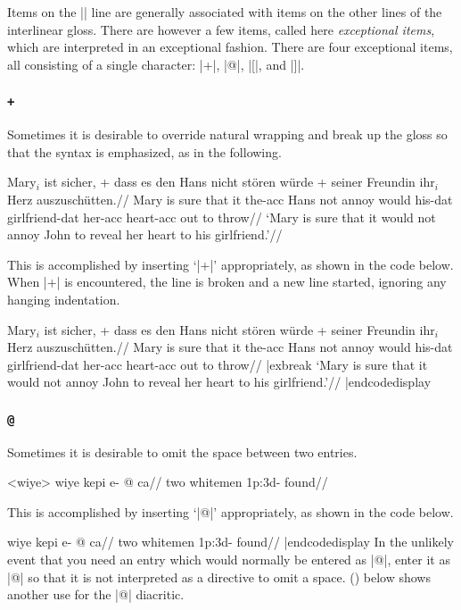 Items on the |\gla| line are generally associated with items on
the other lines of the interlinear gloss.  There are however a
few items, called here {\it exceptional items}, which are
interpreted in an exceptional fashion. There are four exceptional
items, all consisting of a single character: |+|, |@|, |[|, and
|]|.

\subsubsection {\tt +}

%
Sometimes it is desirable to override natural wrapping and
break up the gloss so that the syntax is emphasized, as in the
following.

\framedisplay
\ex
\begingl
\gla Mary$_i$ ist sicher, + dass es den Hans nicht st\"oren w\"urde
+ seiner Freundin ihr$_i$ Herz auszusch\"utten.//
\glb Mary is sure that it the-{\sc acc} Hans not annoy would
his-{\sc dat} girlfriend-{\sc dat} her-{\sc acc} heart-{\sc acc} {out to
throw}//
\glft  `Mary is sure that it would not annoy John to reveal her
heart to his girlfriend.'//
\endgl
\xe
\endframedisplay

\bigskip
This is accomplished by inserting `|+|' appropriately, as shown in the
code below.  When |+| is encountered, the line is broken and a new
line started, ignoring any hanging indentation.

\codedisplay
\ex\begingl
\gla Mary$_i$ ist sicher, + dass es den Hans nicht st\"oren w\"urde
+ seiner Freundin ihr$_i$ Herz auszusch\"utten.//
\glb Mary is sure that it the-{\sc acc} Hans not annoy would
his-{\sc dat} girlfriend-{\sc dat} her-{\sc acc} heart-{\sc acc} {out to
throw}//
|exbreak
\glft  `Mary is sure that it would not annoy John to reveal her
heart to his girlfriend.'//
\endgl
\xe
|endcodedisplay

\subsubsection {\tt @}

%
Sometimes it is desirable to omit the space between two entries.

\framedisplay
\ex<wiye>
\begingl
\gla wiye kepi e- @ ca//
\glb two whitemen {\sc 1p:3d}- found//
\endgl
\xe
\endframedisplay

This is accomplished by inserting `|@|' appropriately, as shown
in the code below.

\codedisplay
\ex
\begingl
\gla wiye kepi e- @ ca//
\glb two whitemen {\sc 1p:3d}- found//
\endgl
\xe
|endcodedisplay
In the unlikely event that you need an entry which
would normally be entered as |@|, enter it as |{{@}}|
so that it is not interpreted as a directive to omit a space.
() below shows another use for the |@| diacritic.

